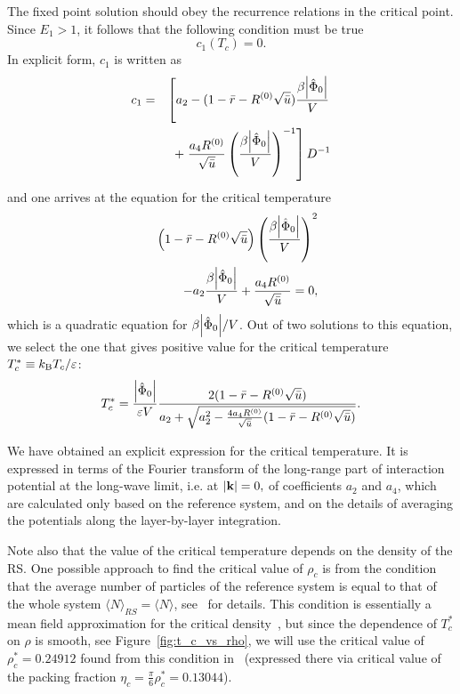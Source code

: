 The fixed point solution should obey the recurrence relations in the critical point. Since $E_1 > 1$, it follows that the following condition must be true
\begin{equation*}
	c_1(T_c) = 0.
\end{equation*}
In explicit form, $c_1$ is written as
\begin{eqnarray*}
	c_1 & = & 
	\left[
		a_2 - (1 - \bar{r} - R^{(0)}\sqrt{\bar{u}})\frac{\beta \abs{\hat{\Phi}_0}}{V} 
		\right.
		\\
		&& + \left.\frac{a_4 R^{(0)}}{\sqrt{\bar{u}}} \left(\frac{\beta \abs{\hat{\Phi}_0}}{V}\right)^{-1}
	\right] D^{-1}
\end{eqnarray*}
and one arrives at the equation for the critical temperature
\begin{eqnarray}
	&& \left(1 - \bar{r} - R^{(0)}\sqrt{\bar{u}} \right) \left(\frac{\beta \abs{\hat{\Phi}_0}}{V}\right)^{2}
	\nonumber
	\\
	& & - a_2  \frac{\beta \abs{\hat{\Phi}_0}}{V} + \frac{a_4 R^{(0)}}{\sqrt{\bar{u}}} = 0,
\end{eqnarray}
which is a quadratic equation for $\beta \abs{\hat{\Phi}_0}/{V}$. Out of two solutions to this equation, we select the one that gives positive value for the critical temperature $T^*_c\equiv k_{\rm B} T_c/\varepsilon$:
\begin{equation}
	\label{eq:T_c}
	T^*_c = \frac{\abs{\hat{\Phi}_0}}{\varepsilon V}
		\frac
		{2(1 - \bar{r} - R^{(0)}\sqrt{\bar{u}})}
		{a_2 + \sqrt{a_2^2 - \frac{4 a_4 R^{(0)}}{\sqrt{\bar{u}}} (1 - \bar{r} - R^{(0)}\sqrt{\bar{u}}) } }.
\end{equation}

We have obtained an explicit expression for the critical temperature. It is expressed in terms of the Fourier transform of the long-range part of interaction potential at the long-wave limit, i.e. at $\abs{\vb k} = 0,$ of coefficients $a_2$ and $a_4$, which are calculated only based on the reference system, and on the details of averaging the potentials along the layer-by-layer integration. 

Note also that the value of the critical temperature depends on the density of the RS. One possible approach to find the critical value of $\rho_c$ is from the condition that the average number of particles of the reference system is equal to that of the whole system $\langle N \rangle_{RS} = \langle N \rangle$, see~\cite{RomaJPS2024} for details. This condition is essentially a mean field approximation for the critical density~\cite{CaillolPatsahan2005,CaillolPatsahan2006}, but since the dependence of $T^*_c$ on $\rho$ is smooth, see Figure~\ref{fig:t_c_vs_rho}, we will use the critical value of $\rho_c^*=0.24912$ found from this condition in~\cite{YukhJSP1995} (expressed there via critical value of the packing fraction $\eta_c = \frac{\pi}{6}\rho^*_c = 0.13044$).

